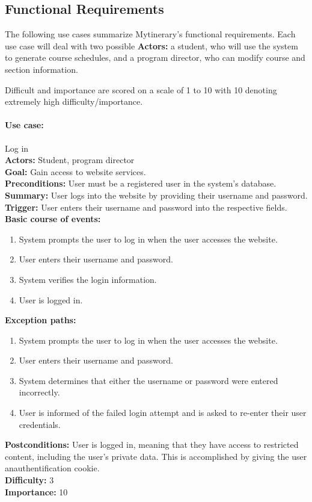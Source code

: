 \documentclass[12pt]{article}
\begin{document}
\subsection{Functional Requirements}
The following use cases summarize Mytinerary's functional requirements. Each
use case will deal with two possible \textbf{Actors:} a student, who will use the
system to generate course schedules, and a program director, who can modify
course and section information.

Difficult and importance are scored on a scale of 1 to 10 with 10 denoting extremely high difficulty/importance.\\

\paragraph*{Use case:} Log in\\
\textbf{Actors:} Student, program director\\
\textbf{Goal:} Gain access to website services.\\
\textbf{Preconditions:} User must be a registered user in the system's database.\\
\textbf{Summary:} User logs into the website by providing their username and password.\\
\textbf{Trigger:} User enters their username and password into the respective fields.\\
\textbf{Basic course of events:}
\begin{enumerate}
\item System prompts the user to log in when the user accesses the website.
\item User enters their username and password.
\item System verifies the login information.
\item User is logged in.
\end{enumerate}
\textbf{Exception paths:}
\begin{enumerate}
\item System prompts the user to log in when the user accesses the website.
\item User enters their username and password.
\item System determines that either the username or password were entered incorrectly.
\item User is informed of the failed login attempt and is asked to re-enter their
user credentials.
\end{enumerate}
\textbf{Postconditions:} User is logged in, meaning that they have access to restricted content, including the user's private data. This is accomplished by giving the user anauthentification cookie.\\
\textbf{Difficulty:} 3\\
\textbf{Importance:} 10\\
\end{document}
